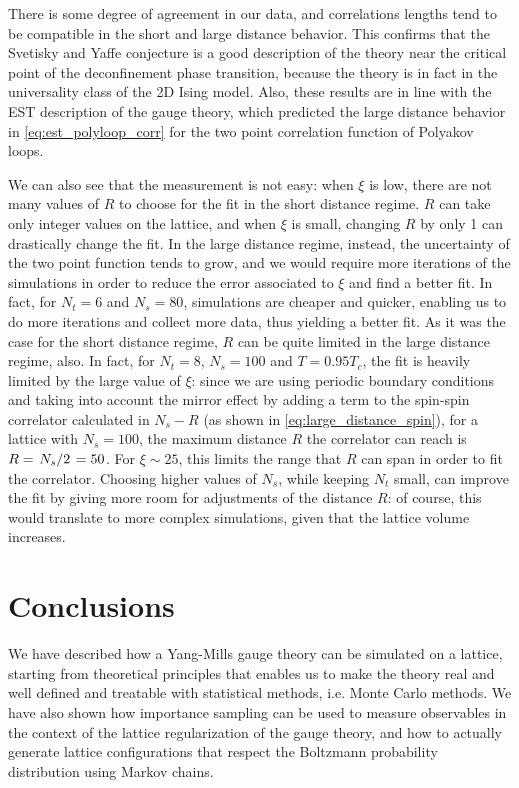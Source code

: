 \documentclass[reqno,12pt]{article}
\numberwithin{equation}{section}
\begin{document}
There is some degree of agreement in our data, and correlations lengths tend to be compatible in the short
and large distance behavior. This confirms that the Svetisky and Yaffe conjecture
is a good description of the theory near the critical point of the deconfinement phase transition, because the theory
is in fact in the universality class of the 2D Ising model. 
Also, these results are in line with the EST description
of the gauge theory, which predicted the large distance behavior in \eqref{eq:est_polyloop_corr} for the two point 
correlation function of Polyakov loops.

We can also see that the measurement is not easy: when $\xi$ is low, there
are not many values of $R$ to choose for the fit in the short distance regime. $R$ can take only integer values on the lattice,
and when $\xi$ is small, changing $R$ by only 1 can drastically change the fit. In the large distance regime, instead, the
uncertainty of the two point function tends to grow, and we would require more iterations of the simulations in order to reduce
the error associated to $\xi$ and find a better fit. In fact, for $N_t = 6$ and $N_s = 80$, simulations are cheaper and quicker,
enabling us to do more iterations and collect more data, thus yielding a better fit. As it was the case for the short distance
regime, $R$ can be quite limited in the large distance regime, also. In fact, for $N_t = 8$, $N_s = 100$ and $T = 0.95T_c$,
the fit is heavily limited by the large value of $\xi$: since we are using periodic boundary conditions and taking into 
account the mirror effect by adding a term to the spin-spin correlator calculated
in $N_s - R$ (as shown in \eqref{eq:large_distance_spin}), for a lattice with $N_s = 100$, the maximum distance $R$ the
correlator can reach is $R = \flatfrac{N_s}{2} = 50$. For $\xi \sim 25$, this limits the range that $R$ can span in order
to fit the correlator. Choosing higher values of $N_s$, while keeping $N_t$ small, can improve the fit by giving more room
for adjustments of the distance $R$: of course, this would translate to more complex simulations, given that the lattice
volume increases. 

\newpage

\section{Conclusions} \label{conclusions}

We have described how a Yang-Mills gauge theory can be simulated on a lattice, starting from theoretical principles
that enables us to make the theory real and well defined and treatable with statistical methods, i.e. Monte Carlo methods.
We have also shown how importance sampling can be used to measure observables in the context of the lattice regularization
of the gauge theory, and how to actually generate lattice configurations that respect the Boltzmann probability 
distribution using Markov chains.
\end{document}
